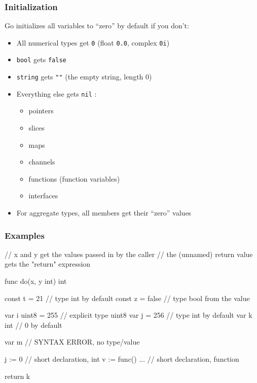 \documentclass[handout,compress,t,11pt]{beamer}
\begin{document}
\begin{frame}[fragile]
    \frametitle{Initialization}
    Go initializes all variables to ``zero'' by default if you don't:
    \begin{itemize}
        \item All numerical types get \verb|0| (float \verb|0.0|, complex \verb|0i|) \\
        \vspace{0.5\baselineskip}
        \item \verb|bool| gets \verb|false| \\
        \vspace{0.5\baselineskip}
        \item \verb|string| gets \verb|""| (the empty string, length 0)\\
        \vspace{0.5\baselineskip}
        \item Everything else gets \verb|nil| :\\
        \begin{itemize}
        \item pointers
        \item slices
        \item maps
        \item channels
        \item functions (function variables)
        \item interfaces
        \end{itemize}
        \vspace{0.5\baselineskip}
        \item For aggregate types, all members get their ``zero'' values \\
    \end{itemize}
\end{frame}

\begin{frame}[fragile]
    \frametitle{Examples}
\begin{golang}
// x and y get the values passed in by the caller
// the (unnamed) return value gets the "return" expression

func do(x, y int) int {
    const t = 21            // type int by default
    const z = false         // type bool from the value

    var i uint8 = 255       // explicit type uint8
    var j = 256             // type int by default
    var k int               // 0 by default

    var m                   // SYNTAX ERROR, no type/value

    j := 0                  // short declaration, int
    v := func() { ... }     // short declaration, function

    return k
}
\end{golang}
\end{frame}
\end{document}

